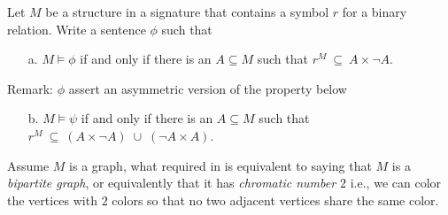 \begin{exercise}\label{ex_grafo_bipartito}
Let $M$ be a structure in a signature that contains a symbol $r$ for a binary relation.
Write a sentence $\phi$ such that 
\begin{itemize} 
\item[a.] $M\models\phi$ if and only if there is an $A\subseteq M$ such that $r^M\ \subseteq\ A\times\neg A$.
\end{itemize}
Remark: $\phi$ assert an asymmetric version of the property below
\begin{itemize} 
\item[b.] $M\models\psi$ if and only if there is an $A\subseteq M$ such that $r^M\ \subseteq\ (A\times \neg A)\;\cup\;(\neg A\times A)$.
\end{itemize}
Assume $M$ is a graph, what required in  is equivalent to saying that $M$ is a \textit{bipartite graph}, or equivalently that it has \textit{chromatic number $2$\/} i.e., we can color the vertices with $2$ colors so that no two adjacent vertices share the same color.\QED
\end{exercise}


